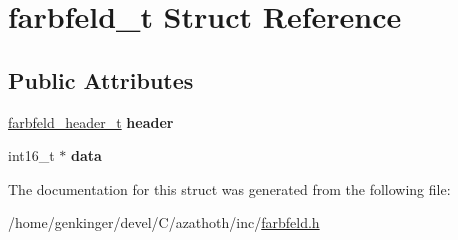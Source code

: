 \hypertarget{structfarbfeld__t}{}\section{farbfeld\+\_\+t Struct Reference}
\label{structfarbfeld__t}
\subsection*{Public Attributes}
\begin{DoxyCompactItemize}
\item 
\mbox{\label{structfarbfeld__t_aef2434436c9f9cf459d0b90011ce7d7e}} 
\mbox{\hyperlink{structfarbfeld__header__t}{farbfeld\+\_\+header\+\_\+t}} {\bfseries header}
\item 
\mbox{\label{structfarbfeld__t_a6288d264da362cf00af9f221b2382dc1}} 
int16\+\_\+t $\ast$ {\bfseries data}
\end{DoxyCompactItemize}


The documentation for this struct was generated from the following file\+:\begin{DoxyCompactItemize}
\item 
/home/genkinger/devel/\+C/azathoth/inc/\mbox{\hyperlink{farbfeld_8h}{farbfeld.\+h}}\end{DoxyCompactItemize}
